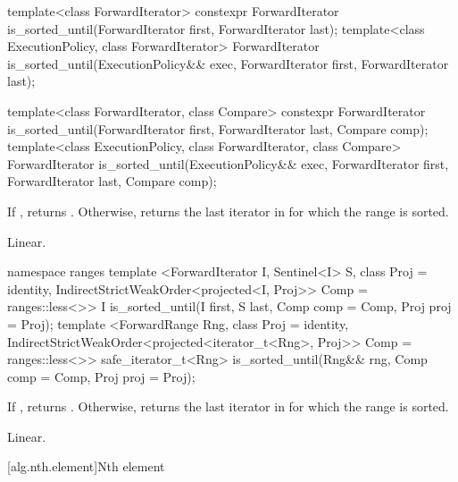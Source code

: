 %
\begin{itemdecl}
template<class ForwardIterator>
  constexpr ForwardIterator
    is_sorted_until(ForwardIterator first, ForwardIterator last);
template<class ExecutionPolicy, class ForwardIterator>
  ForwardIterator
    is_sorted_until(ExecutionPolicy&& exec,
                    ForwardIterator first, ForwardIterator last);

template<class ForwardIterator, class Compare>
  constexpr ForwardIterator
    is_sorted_until(ForwardIterator first, ForwardIterator last,
                    Compare comp);
template<class ExecutionPolicy, class ForwardIterator, class Compare>
  ForwardIterator
    is_sorted_until(ExecutionPolicy&& exec,
                    ForwardIterator first, ForwardIterator last,
                    Compare comp);
\end{itemdecl}

\begin{itemdescr}
\pnum
\returns If , returns
. Otherwise, returns
the last iterator  in  for which the
range  is sorted.

\pnum
\complexity Linear.
\end{itemdescr}

\begin{addedblock}
%
\begin{itemdecl}
namespace ranges {
  template <ForwardIterator I, Sentinel<I> S, class Proj = identity,
            IndirectStrictWeakOrder<projected<I, Proj>> Comp = ranges::less<>>
    I is_sorted_until(I first, S last, Comp comp = Comp{}, Proj proj = Proj{});
  template <ForwardRange Rng, class Proj = identity,
            IndirectStrictWeakOrder<projected<iterator_t<Rng>, Proj>> Comp = ranges::less<>>
    safe_iterator_t<Rng> is_sorted_until(Rng&& rng, Comp comp = Comp{}, Proj proj = Proj{});
}
\end{itemdecl}

\begin{itemdescr}
\pnum
\returns If , returns
. Otherwise, returns
the last iterator  in  for which the
range  is sorted.

\pnum
\complexity Linear.
\end{itemdescr}
\end{addedblock}

[alg.nth.element]{Nth element}

